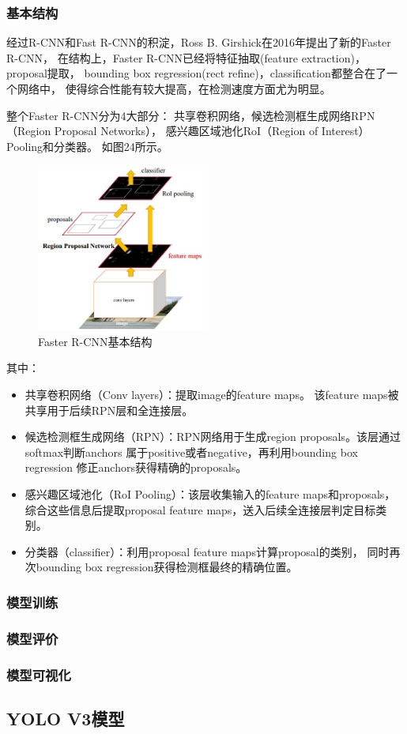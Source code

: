 \documentclass[UTF8]{ctexart}
\begin{document}
\subsubsection{基本结构}
经过R-CNN和Fast R-CNN的积淀，Ross B. Girshick在2016年提出了新的Faster R-CNN，
在结构上，Faster R-CNN已经将特征抽取(feature extraction)，proposal提取，
bounding box regression(rect refine)，classification都整合在了一个网络中，
使得综合性能有较大提高，在检测速度方面尤为明显。

整个Faster R-CNN分为4大部分：
共享卷积网络，候选检测框生成网络RPN（Region Proposal Networks），
感兴趣区域池化RoI（Region of Interest）Pooling和分类器。
如图24所示。

\begin{figure}[htbp]
    \centering
    \includegraphics[width=0.50\textwidth]{../img/fasterR-CNN.jpg}
    \caption{Faster R-CNN基本结构}
\end{figure}

其中：
\begin{itemize}
    \item 共享卷积网络（Conv layers）：提取image的feature maps。
    该feature maps被共享用于后续RPN层和全连接层。
    \item 候选检测框生成网络（RPN）：RPN网络用于生成region proposals。该层通过softmax判断anchors
    属于positive或者negative，再利用bounding box regression
    修正anchors获得精确的proposals。
    \item 感兴趣区域池化（RoI Pooling）：该层收集输入的feature maps和proposals，
    综合这些信息后提取proposal feature maps，送入后续全连接层判定目标类别。
    \item 分类器（classifier）：利用proposal feature maps计算proposal的类别，
    同时再次bounding box regression获得检测框最终的精确位置。
\end{itemize}

\subsubsection{模型训练}

\subsubsection{模型评价}

\subsubsection{模型可视化}

\subsection{YOLO V3模型}
\end{document}

